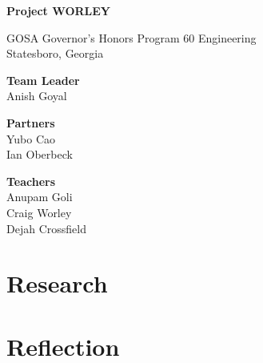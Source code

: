 \documentclass{article}
\newcounter{reflection}
\renewcommand{\title}{Project WORLEY}
\begin{document}
\begin{titlepage}
  \centering
  \vspace*{1in}
  {\fontsize{56pt}{2\baselineskip}\selectfont \bfseries
  \title}
  \vfill

  \Large
  GOSA Governor's Honors Program 60 Engineering \\
  Statesboro, Georgia

  \vspace{0.5in}
  \selectfont
  
  \vspace{0.2em}
  \textbf{Team Leader} \\ Anish Goyal

  \vspace{0.2em}
  \textbf{Partners} \\ Yubo Cao \\ Ian Oberbeck

  \vspace{0.2em}
  \textbf{Teachers} \\ Anupam Goli \\ Craig Worley \\ Dejah Crossfield
\end{titlepage}
\tableofcontents
\newpage



\part{Research}

\part{Reflection}










 
\nocite{*}
\printbibliography
\end{document}
